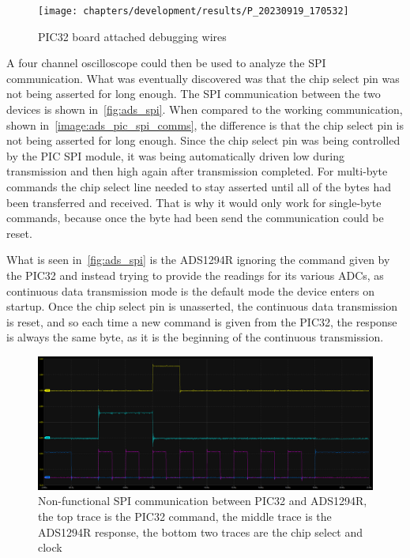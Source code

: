 \begin{figure}[!ht]
  \caption{PIC32 board attached debugging wires}\label{fig:pic_wires}
  \centering
  \texttt{[image: chapters/development/results/P\_20230919\_170532]}
\end{figure}

A four channel oscilloscope could then be used to analyze the SPI communication.
What was eventually discovered was that the chip select pin was not being asserted for long enough.
The SPI communication between the two devices is shown in~\autoref{fig:ads_spi}.
When compared to the working communication, shown in~\autoref{image:ads_pic_spi_comms},
the difference is that the chip select pin is not being asserted for long enough.
Since the chip select pin was being controlled by the PIC SPI module,
it was being automatically driven low during transmission and then high again after transmission completed.
For multi-byte commands the chip select line needed to stay asserted until all of the bytes had been transferred and received.
That is why it would only work for single-byte commands, because once the byte had been send the communication could be reset.

What is seen in~\autoref{fig:ads_spi} is the ADS1294R ignoring the command given by the PIC32
and instead trying to provide the readings for its various ADCs,
as continuous data transmission mode is the default mode the device enters on startup.
Once the chip select pin is unasserted, the continuous data transmission is reset,
and so each time a new command is given from the PIC32,
the response is always the same byte, as it is the beginning of the continuous transmission.

\begin{figure}[!ht]
  \caption{Non-functional SPI communication between PIC32 and ADS1294R,
    the top trace is the PIC32 command, the middle trace is the ADS1294R response,
    the bottom two traces are the chip select and clock}\label{fig:ads_spi}
  \centering
  \includegraphics[width=1\columnwidth]{chapters/development/results/ADS_SPI_COMMS}
\end{figure}

